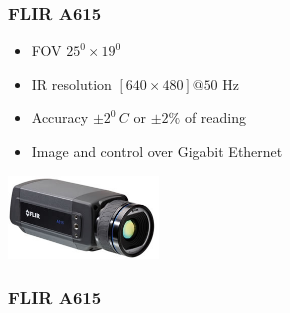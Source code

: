 \documentclass[t]{beamer}
\begin{document}
\begin{frame}
 \frametitle{FLIR A615}
\begin{itemize}
  \item FOV $25^0 \times 19^0$
  \item IR resolution $[640 \times 480]@50$ Hz
  \item Accuracy $\pm 2^0\,C$ or $\pm 2\%$ of reading
  \item Image and control over Gigabit Ethernet
\end{itemize}

\vspace{5ex}\hspace{37ex}\includegraphics[width=4cm]{img/A615_300.jpg}
\end{frame}

\begin{frame}
 \frametitle{FLIR A615}
\end{frame}
\end{document}
